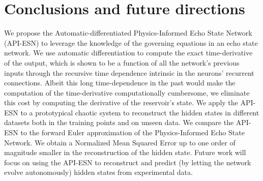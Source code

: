\documentclass[runningheads]{llncs}
\begin{document}


\section{Conclusions and future directions}
We propose the Automatic-differentiated Physics-Informed Echo State Network (API-ESN) to leverage the knowledge of the governing equations in an echo state network. 
We use automatic differentiation to compute the exact time-derivative of the output, which is shown to be a function of all the network's previous inputs
through the recursive time dependence intrinsic in the neurons' recurrent connections. Albeit this long time-dependence in the past would make the computation of the time-derivative computationally cumbersome, 
we eliminate this cost by computing the derivative of the reservoir's state. 
We apply the API-ESN to a prototypical chaotic system to reconstruct the hidden states in different datasets both in the training points and on unseen data. We compare the API-ESN to the forward Euler approximation of the Physics-Informed Echo State Network. We obtain a Normalized Mean Squared Error up to one order of magnitude smaller in the reconstruction of the hidden state. 
Future work will focus on using the API-ESN to reconstruct and predict (by letting the network evolve autonomously) hidden states from experimental data. 

\label{sec:conc}
%
%
%
%

%
\end{document}
